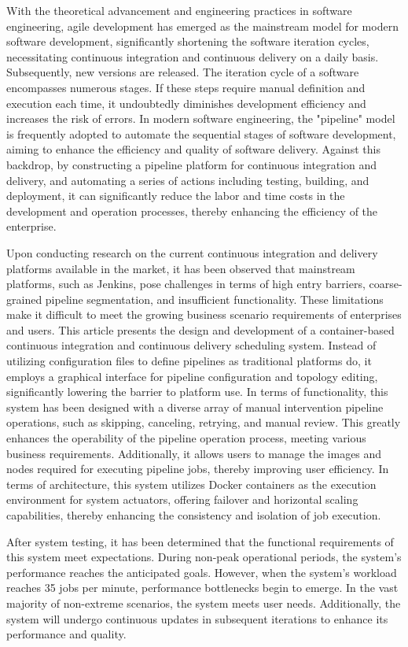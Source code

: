 \begin{abstract*}
  With the theoretical advancement and engineering practices in software engineering, agile development has emerged as the mainstream model for modern software development, significantly shortening the software iteration cycles, necessitating continuous integration and continuous delivery on a daily basis.
  Subsequently, new versions are released. The iteration cycle of a software encompasses numerous stages.  If these steps require manual definition and execution each time, it undoubtedly diminishes development efficiency and increases the risk of errors.
  In modern software engineering, the "pipeline" model is frequently adopted to automate the sequential stages of software development, aiming to enhance the efficiency and quality of software delivery.
  Against this backdrop, by constructing a pipeline platform for continuous integration and delivery, and automating a series of actions including testing, building, and deployment, it can significantly reduce the labor and time costs in the development and operation processes, thereby enhancing the efficiency of the enterprise.
  
  Upon conducting research on the current continuous integration and delivery platforms available in the market, it has been observed that mainstream platforms, such as Jenkins, pose challenges in terms of high entry barriers, coarse-grained pipeline segmentation, and insufficient functionality.  These limitations make it difficult to meet the growing business scenario requirements of enterprises and users.
  This article presents the design and development of a container-based continuous integration and continuous delivery scheduling system.  Instead of utilizing configuration files to define pipelines as traditional platforms do, it employs a graphical interface for pipeline configuration and topology editing, significantly lowering the barrier to platform use.
  In terms of functionality, this system has been designed with a diverse array of manual intervention pipeline operations, such as skipping, canceling, retrying, and manual review.  This greatly enhances the operability of the pipeline operation process, meeting various business requirements.  Additionally, it allows users to manage the images and nodes required for executing pipeline jobs, thereby improving user efficiency.
  In terms of architecture, this system utilizes Docker containers as the execution environment for system actuators, offering failover and horizontal scaling capabilities, thereby enhancing the consistency and isolation of job execution.
  
  After system testing, it has been determined that the functional requirements of this system meet expectations.  During non-peak operational periods, the system's performance reaches the anticipated goals.  However, when the system's workload reaches 35 jobs per minute, performance bottlenecks begin to emerge.
  In the vast majority of non-extreme scenarios, the system meets user needs. Additionally, the system will undergo continuous updates in subsequent iterations to enhance its performance and quality.
\end{abstract*}
